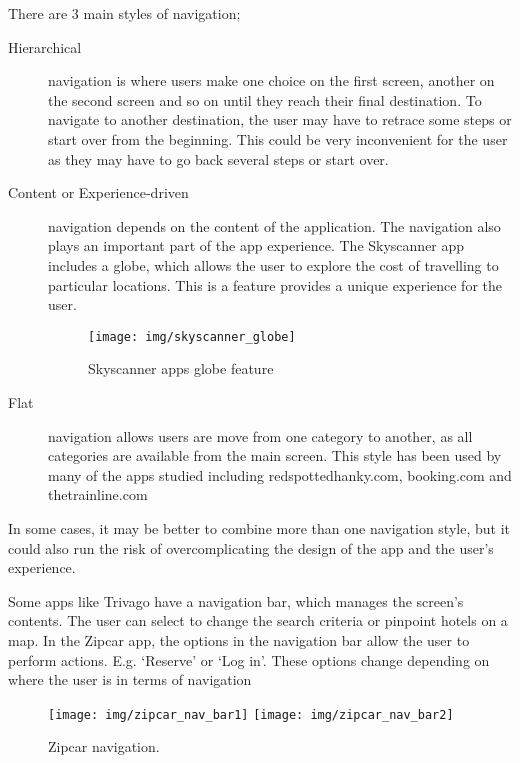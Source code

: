 There are 3 main styles of navigation;
\begin{description}
	\item[Hierarchical] navigation is where users make one choice on the first
		screen, another on the second screen and so on until they reach their
		final destination. To navigate to another destination, the user may
		have to retrace some steps or start over from the beginning. This could
		be very inconvenient for the user as they may have to go back several
		steps or start over.
	\item[Content or Experience-driven] navigation depends on the content of
		the application. The navigation also plays an important part of the app
		experience. The Skyscanner app includes a globe, which allows the user
		to explore the cost of travelling to particular locations. This is a
		feature provides a unique experience for the user.
		\begin{figure}[ht]
			\begin{center}
				\texttt{[image: img/skyscanner\_globe]}
			\end{center}
			\caption{Skyscanner apps globe feature}\label{fig:skyscanner_globe}
		\end{figure}

	\item[Flat] navigation allows users are move from one category to another,
		as all categories are available from the main screen. This style has
		been used by many of the apps studied including redspottedhanky.com,
		booking.com and thetrainline.com
\end{description}

In some cases, it may be better to combine more than one navigation style, but
it could also run the risk of overcomplicating the design of the app and the
user's experience.

Some apps like Trivago have a navigation bar, which manages the screen's
contents. The user can select to change the search criteria or pinpoint hotels
on a map. In the Zipcar app, the options in the navigation bar allow the user
to perform actions. E.g. `Reserve' or `Log in'. These options change depending
on where the user is in terms of navigation
\begin{figure}[ht]
	\begin{center}
		\texttt{[image: img/zipcar\_nav\_bar1]}
		\quad
		\texttt{[image: img/zipcar\_nav\_bar2]}
	\end{center}
	\caption{Zipcar navigation\cite{ZipCarIOS}.}\label{fig:zipcar_nav_bar}
\end{figure}

